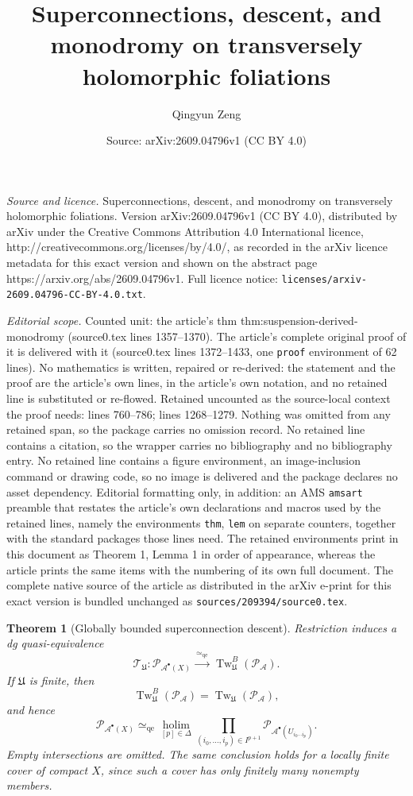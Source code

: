 \documentclass[10pt,a4paper]{amsart}
\title{Superconnections, descent, and monodromy on transversely holomorphic foliations}
\author{Qingyun Zeng}
\date{Source: arXiv:2609.04796v1 (CC BY 4.0)}
\newtheorem{thm}{Theorem}
\newcommand{\CA}{\mathcal A}
\begin{document}
\maketitle

\noindent\emph{Source and licence.} Superconnections, descent, and monodromy on transversely holomorphic foliations. Version arXiv:2609.04796v1 (CC BY 4.0), distributed by arXiv under the Creative Commons Attribution 4.0 International licence, http://creativecommons.org/licenses/by/4.0/, as recorded in the arXiv licence metadata for this exact version and shown on the abstract page https://arxiv.org/abs/2609.04796v1. Full licence notice: \texttt{licenses/arxiv-2609.04796-CC-BY-4.0.txt}.\par\smallskip

\noindent\textit{Editorial scope.} Counted unit: the article's thm thm:suspension-derived-monodromy (source0.tex lines 1357--1370). The article's complete original proof of it is delivered with it (source0.tex lines 1372--1433, one \texttt{proof} environment of 62 lines). No mathematics is written, repaired or re-derived: the statement and the proof are the article's own lines, in the article's own notation, and no retained line is substituted or re-flowed.  Retained uncounted as the source-local context the proof needs: lines 760--786; lines 1268--1279.  Nothing was omitted from any retained span, so the package carries no omission record.  No retained line contains a citation, so the wrapper carries no bibliography and no bibliography entry.  No retained line contains a figure environment, an image-inclusion command or drawing code, so no image is delivered and the package declares no asset dependency.  Editorial formatting only, in addition: an AMS \texttt{amsart} preamble that restates the article's own declarations and macros used by the retained lines, namely the environments \texttt{thm}, \texttt{lem} on separate counters, together with the standard packages those lines need.  The retained environments print in this document as Theorem 1, Lemma 1 in order of appearance, whereas the article prints the same items with the numbering of its own full document.  The complete native source of the article as distributed in the arXiv e-print for this exact version is bundled unchanged as \texttt{sources/209394/source0.tex}.
\begin{thm}[Globally bounded superconnection descent]
\label{thm:eis-cohesive-descent}
Restriction induces a dg quasi-equivalence
\[
\mathcal T_{\mathfrak U}:
\mathcal P_{\CA^\bullet(X)}
\xrightarrow{\ \simeq_{\mathrm{qe}}\ }
\operatorname{Tw}^B_{\mathfrak U}(\mathcal P_{\CA}).
\]
If \(\mathfrak U\) is finite, then
\[
\operatorname{Tw}^B_{\mathfrak U}(\mathcal P_{\CA})
=
\operatorname{Tw}_{\mathfrak U}(\mathcal P_{\CA}),
\]
and hence
\[
\mathcal P_{\CA^\bullet(X)}
\simeq_{\mathrm{qe}}
\operatorname*{holim}_{[p]\in\Delta}
\prod_{(i_0,\ldots,i_p)\in I^{p+1}}
\mathcal P_{\CA^\bullet(U_{i_0\cdots i_p})}.
\]
Empty intersections are omitted.  The same conclusion holds for a locally
finite cover of compact \(X\), since such a cover has only finitely many
nonempty members.
\end{thm}
\end{document}
